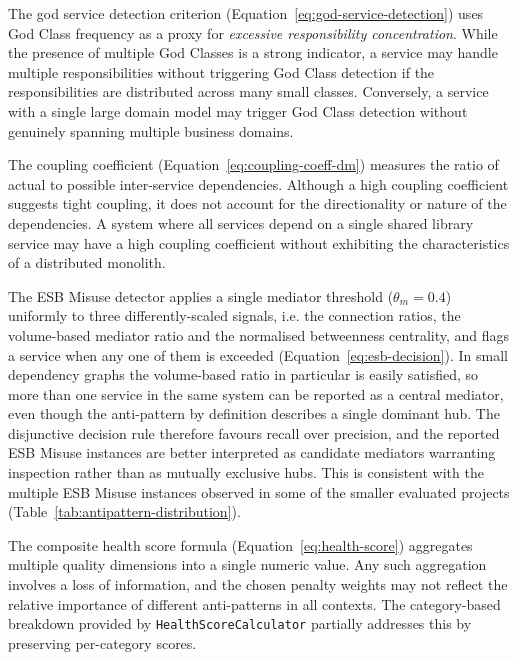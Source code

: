 \par The god service detection criterion (Equation~\ref{eq:god-service-detection}) uses God Class frequency as a proxy for \textit{excessive responsibility concentration}. While the presence of multiple God Classes is a strong indicator, a service may handle multiple responsibilities without triggering God Class detection if the responsibilities are distributed across many small classes. Conversely, a service with a single large domain model may trigger God Class detection without genuinely spanning multiple business domains.

\par The coupling coefficient (Equation~\ref{eq:coupling-coeff-dm}) measures the ratio of actual to possible inter-service dependencies. Although a high coupling coefficient suggests tight coupling, it does not account for the directionality or nature of the dependencies. A system where all services depend on a single shared library service may have a high coupling coefficient without exhibiting the characteristics of a distributed monolith.

\par The ESB Misuse detector applies a single mediator threshold ($\theta_m = 0.4$) uniformly to three differently-scaled signals, i.e. the connection ratios, the volume-based mediator ratio and the normalised betweenness centrality, and flags a service when any one of them is exceeded (Equation~\ref{eq:esb-decision}). In small dependency graphs the volume-based ratio in particular is easily satisfied, so more than one service in the same system can be reported as a central mediator, even though the anti-pattern by definition describes a single dominant hub. The disjunctive decision rule therefore favours recall over precision, and the reported ESB Misuse instances are better interpreted as candidate mediators warranting inspection rather than as mutually exclusive hubs. This is consistent with the multiple ESB Misuse instances observed in some of the smaller evaluated projects (Table~\ref{tab:antipattern-distribution}).

\par The composite health score formula (Equation~\ref{eq:health-score}) aggregates multiple quality dimensions into a single numeric value. Any such aggregation involves a loss of information, and the chosen penalty weights may not reflect the relative importance of different anti-patterns in all contexts. The category-based breakdown provided by \texttt{HealthScoreCalculator} partially addresses this by preserving per-category scores.

